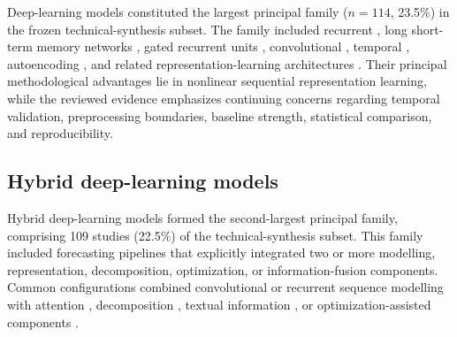 \documentclass[12pt]{article}
\numberwithin{equation}{section}
\begin{document}
Deep-learning models \cite{P00021,P00042,P00044,P00056,P00063,P00077,P00078,P00114,P00162,P00191,P00202,P00233,P03420,P03475,P03576,P03634,P03654,P03661,P03870,P03943,P04100,P04285} constituted the largest principal family
($n=114$, 23.5\%) in the frozen technical-synthesis subset. The family
included recurrent \cite{P00235,P00251,P00277,P00317,P00348,P00353,P00370,P00416,P00439,P00452,P00464,P00471}, long short-term memory networks \cite{P00489,P00564,P00570,P00576,P00587,P00645,P00646,P00649,P00650,P00652,P00656,P00661}, gated recurrent units \cite{P00671,P00677,P00730,P00739,P00750,P00765,P00791,P00811,P00821,P00826,P00829,P00834}, convolutional \cite{P00851,P00852,P00935,P00940,P00976,P01023,P01056,P01062,P01116,P01123,P01155}, temporal \cite{P01182,P01195,P01229,P01231,P01233,P01323,P01371,P01437,P01471,P01487,P01495,P01551}, autoencoding \cite{P01589,P01637,P01849,P01885,P01901,P01911,P01953,P02051,P02056,P02095,P02138,P02139}, and related
representation-learning architectures \cite{P02220,P02244,P02639,P02878,P02922,P02943,P02950,P03089,P03221,P03226,P03384,P03397}. Their principal methodological
advantages lie in nonlinear sequential representation learning, while the
reviewed evidence emphasizes continuing concerns regarding temporal
validation, preprocessing boundaries, baseline strength, statistical
comparison, and reproducibility.

\subsection{Hybrid deep-learning models}
\label{sec:supp-hybrid-deep-learning}

Hybrid deep-learning models formed the second-largest principal family,
comprising 109 studies (22.5\%) of the technical-synthesis subset.
This family included forecasting pipelines that explicitly integrated two
or more modelling, representation, decomposition, optimization, or
information-fusion components. Common configurations combined convolutional \cite{P00930,P00931,P00943}
or recurrent sequence modelling with attention \cite{P00015,P00020,P00022,P00030,P00037,P00072,P00092,P00099,P00117,P00124,P00130,P00140}, decomposition \cite{P00321,P00334,P00339,P00346,P00366,P00373,P00390,P00394,P00410,P00413,P00415,P00419,P01245,P01290,P01429,P01591,P01708,P01936,P02257,P02398,P02416,P02517,P02669,P02696}, textual
information \cite{P00421,P00425,P00434,P00435,P00443,P00444,P00447,P00450,P00466,P00467,P00488,P00501}, or optimization-assisted components \cite{P00506,P00510,P00519,P00537,P00543,P00553,P00554,P00560,P00569,P00572,P00584,P00633}.
\end{document}
